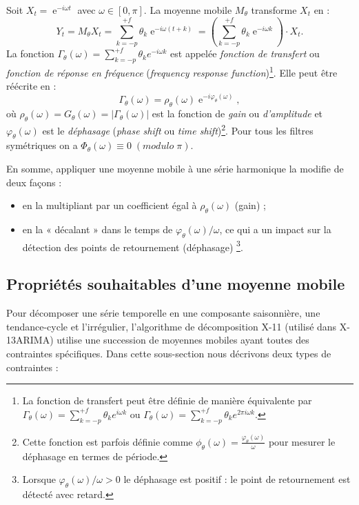 \documentclass[
  12pt,
  a4paper,french]{article}
\DeclareMathOperator{\e}{e}
\newcommand\1{\mathds{1}}
\begin{document}
Soit \(X_t=\e^{-i\omega t}\) avec \(\omega\in[0,\pi]\). La moyenne mobile \(M_\theta\) transforme \(X_t\) en :
\[
Y_t = M_{\theta}X_t = \sum_{k=-p}^{+f} \theta_k \e^{-i \omega (t+k)}
= \left(\sum_{k=-p}^{+f} \theta_k \e^{-i \omega k}\right)\cdot X_t.
\]
La fonction \(\Gamma_\theta(\omega)=\sum_{k=-p}^{+f} \theta_k e^{-i \omega k}\) est appelée \emph{fonction de transfert} ou \emph{fonction de réponse en fréquence} (\emph{frequency response function})\footnote{
  La fonction de transfert peut être définie de manière équivalente par \(\Gamma_\theta(\omega)=\sum_{k=-p}^{+f} \theta_k e^{i \omega k}\) ou \(\Gamma_\theta(\omega)=\sum_{k=-p}^{+f} \theta_k e^{2\pi i \omega k}\).}.
Elle peut être réécrite en :
\[
\Gamma_\theta(\omega) = \rho_\theta(\omega)\e^{-i\varphi_\theta(\omega)},
\]
où \(\rho_\theta(\omega)=G_\theta(\omega)=\lvert\Gamma_\theta(\omega)\rvert\) est la fonction de \emph{gain} ou \emph{d'amplitude} et \(\varphi_\theta(\omega)\) est le \emph{déphasage} (\emph{phase shift} ou \emph{time shift})\footnote{
  Cette fonction est parfois définie comme \(\phi_\theta(\omega)=\frac{\varphi_\theta(\omega)}{\omega}\) pour mesurer le déphasage en termes de période.}.
Pour tous les filtres symétriques on a \(\Phi_\theta(\omega)\equiv 0 \;(modulo\;{\pi})\).

En somme, appliquer une moyenne mobile à une série harmonique la modifie de deux façons :

\begin{itemize}
\item
  en la multipliant par un coefficient égal à \(\rho_{\theta}\left(\omega\right)\) (gain) ;
\item
  en la « décalant » dans le temps de \(\varphi_\theta(\omega)/\omega\), ce qui a un impact sur la détection des points de retournement (déphasage) \footnote{
    Lorsque \(\varphi_\theta(\omega)/\omega>0\) le déphasage est positif : le point de retournement est détecté avec retard.}.
\end{itemize}

\hypertarget{propriuxe9tuxe9s-souhaitables-dune-moyenne-mobile}{%
\subsection{Propriétés souhaitables d'une moyenne mobile}\label{propriuxe9tuxe9s-souhaitables-dune-moyenne-mobile}}

Pour décomposer une série temporelle en une composante saisonnière, une tendance-cycle et l'irrégulier, l'algorithme de décomposition X-11 (utilisé dans X-13ARIMA) utilise une succession de moyennes mobiles ayant toutes des contraintes spécifiques.
Dans cette sous-section nous décrivons deux types de contraintes :
\end{document}
